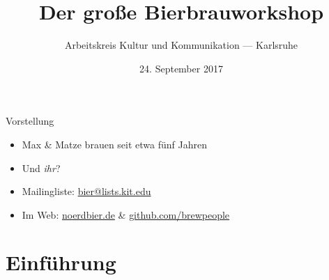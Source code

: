 \documentclass[9pt, ngerman]{beamer}
\title{Der große Bierbrauworkshop}
\author{Arbeitskreis Kultur und Kommunikation --- Karlsruhe}
\date{24. September 2017}
\begin{document}
\maketitle


\begin{frame}{Vorstellung}
  \begin{itemize}
    \item Max \& Matze brauen seit etwa fünf Jahren
    \item<2-> Und \emph{ihr}?
  \end{itemize}

  \begin{itemize}
    \item Mailingliste: \href{mailto:bier@lists.kit.edu}{bier@lists.kit.edu}
    \item Im Web: \href{http://noerdbier.de}{noerdbier.de} \&
      \href{https://gtihub.com/brewpeople}{github.com/brewpeople}
  \end{itemize}
\end{frame}

\section{Einführung}
\end{document}
